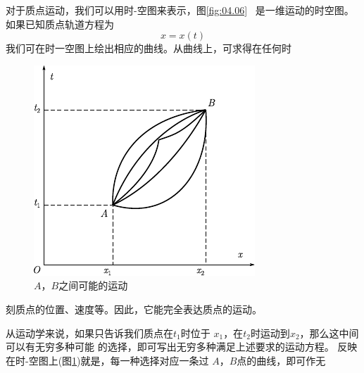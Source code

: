 对于质点运动，我们可以用时-空图来表示，图\ref{fig:04.06}~
是一维运动的时空图。如果已知质点轨道方程为
\begin{equation*}
	x = x ( t ) 
\end{equation*}
我们可在时一空图上绘出相应的曲线。从曲线上，可求得在任何时
\begin{figure}
	\centering
	\includegraphics{figure/fig04.07}
	\caption{$ A $，$ B $之间可能的运动}
	\label{fig:04.07}
\end{figure}
刻质点的位置、速度等。因此，它能完全表达质点的运动。

从运动学来说，如果只告诉我们质点在$ t_1 $时位于
$ x_1 $，在$ t_2 $时运动到$ x_2 $，那么这中间可以有无穷多种可能
的选择，即可写出无穷多种满足上述要求的运动方程。
反映在时-空图上(图\ref{fig:04.07})就是，每一种选择对应一条过
$ A $，$ B $点的曲线，即可作无
